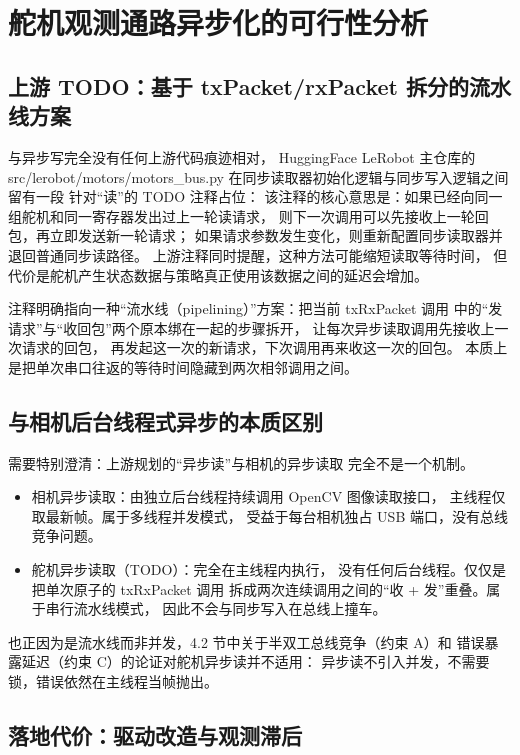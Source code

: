 \section{舵机观测通路异步化的可行性分析}\label{sec:async-read}

\subsection{上游 TODO：基于 txPacket/rxPacket 拆分的流水线方案}\label{sec:async-read-todo}

与异步写完全没有任何上游代码痕迹相对，
HuggingFace LeRobot 主仓库的
src/lerobot/motors/motors\_bus.py
在同步读取器初始化逻辑与同步写入逻辑之间留有一段
针对“读”的 TODO 注释占位：
该注释的核心意思是：如果已经向同一组舵机和同一寄存器发出过上一轮读请求，
则下一次调用可以先接收上一轮回包，再立即发送新一轮请求；
如果请求参数发生变化，则重新配置同步读取器并退回普通同步读路径。
上游注释同时提醒，这种方法可能缩短读取等待时间，
但代价是舵机产生状态数据与策略真正使用该数据之间的延迟会增加。

注释明确指向一种“流水线（pipelining）”方案：把当前 txRxPacket 调用
中的“发请求”与“收回包”两个原本绑在一起的步骤拆开，
让每次异步读取调用先接收上一次请求的回包，
再发起这一次的新请求，下次调用再来收这一次的回包。
本质上是把单次串口往返的等待时间隐藏到两次相邻调用之间。

\subsection{与相机后台线程式异步的本质区别}\label{sec:async-read-not-thread}

需要特别澄清：上游规划的“异步读”与相机的异步读取
完全不是一个机制。
\begin{itemize}[leftmargin=2em]
  \item 相机异步读取：由独立后台线程持续调用 OpenCV 图像读取接口，
        主线程仅取最新帧。属于多线程并发模式，
        受益于每台相机独占 USB 端口，没有总线竞争问题。
  \item 舵机异步读取（TODO）：完全在主线程内执行，
        没有任何后台线程。仅仅是把单次原子的 txRxPacket 调用
        拆成两次连续调用之间的“收 + 发”重叠。属于串行流水线模式，
        因此不会与同步写入在总线上撞车。
\end{itemize}

也正因为是流水线而非并发，4.2 节中关于半双工总线竞争（约束 A）和
错误暴露延迟（约束 C）的论证对舵机异步读并不适用：
异步读不引入并发，不需要锁，错误依然在主线程当帧抛出。

\subsection{落地代价：驱动改造与观测滞后}\label{sec:async-read-cost}

